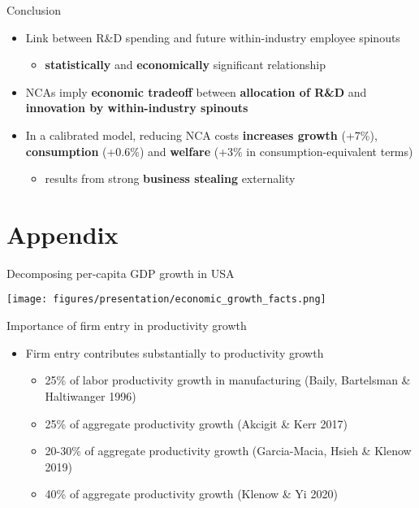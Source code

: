 \documentclass[english,usenames,dvipsnames,handout]{beamer}
\begin{document}
\begin{frame}{Conclusion}
	\begin{itemize}
		\item Link between R\&D spending and future within-industry employee spinouts
		\begin{itemize}
			\item \alert{\textbf{statistically}} and \alert{\textbf{economically}} significant relationship
		\end{itemize}
		\medskip
		\item NCAs imply \alert{\textbf{economic tradeoff}} between \alert{\textbf{allocation of R\&D}} and \alert{\textbf{innovation by within-industry spinouts}}
		\medskip
		\item In a calibrated model, reducing NCA costs \alert{\textbf{increases growth }} (+7\%), \alert{\textbf{consumption}} (+0.6\%) and \alert{\textbf{welfare}} (+3\% in consumption-equivalent terms)
		\begin{itemize}
			\item results from strong \alert{\textbf{business stealing}} externality
		\end{itemize}
	\end{itemize}
\end{frame}

\appendix

\section{Appendix}

\begin{frame}{Decomposing per-capita GDP growth in USA}\label{economic_growth_facts}\hyperlink{motivation_spillovers}{}
	\begin{table}
		\texttt{[image: figures/presentation/economic\_growth\_facts.png]}
		\caption{Growth accounting (from Jones 2016, "The Facts of Economic Growth")}
	\end{table}
\end{frame}

\begin{frame}{Importance of firm entry in productivity growth}\label{motivation:importance_of_firm_entry}
	\hyperlink{motivation_spillovers}{}
	\begin{itemize}
		\item Firm entry contributes substantially to productivity growth
		\begin{itemize}
			\item 25\% of labor productivity growth in manufacturing (Baily, Bartelsman \& Haltiwanger 1996)
			\item 25\% of aggregate productivity growth (Akcigit \& Kerr 2017)
			\item 20-30\% of aggregate productivity growth (Garcia-Macia, Hsieh \& Klenow 2019)
			\item 40\% of aggregate productivity growth (Klenow \& Yi 2020)
		\end{itemize}
	\end{itemize}
\end{frame}
\end{document}
